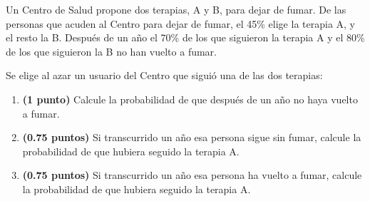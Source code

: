 
Un Centro de Salud propone dos terapias, A y B, para dejar de fumar. De las personas que acuden al Centro para dejar de fumar, el 45\% elige la terapia A, y el resto la B. Después de un año el 70\% de los que siguieron la terapia A y el 80\% de los que siguieron la B no han vuelto a fumar.

Se elige al azar un usuario del Centro que siguió una de las dos terapias:
\begin{enumerate}[label=\alph*)]
\item \textbf{(1 punto)} Calcule la probabilidad de que después de un año no haya vuelto a fumar.
\item \textbf{(0.75 puntos)} Si transcurrido un año esa persona sigue sin fumar, calcule la probabilidad de que hubiera seguido la terapia A.
\item \textbf{(0.75 puntos)} Si transcurrido un año esa persona ha vuelto a fumar, calcule la probabilidad de que hubiera seguido la terapia A.
\end{enumerate}
